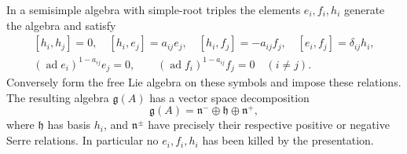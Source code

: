 \begin{proposition}
\label{res:F02}
In a semisimple algebra with simple-root triples the elements
\(e_i,f_i,h_i\) generate the algebra and satisfy
\[
\begin{gathered}
[h_i,h_j]=0,\quad [h_i,e_j]=a_{ij}e_j,\quad
[h_i,f_j]=-a_{ij}f_j,\quad [e_i,f_j]=\delta_{ij}h_i,\\
(\operatorname{ad}e_i)^{1-a_{ij}}e_j=0,\qquad
(\operatorname{ad}f_i)^{1-a_{ij}}f_j=0\quad(i\ne j).
\end{gathered}\tag{6.1}\label{eq:serre-relations}
\]
Conversely form the free Lie algebra on these symbols and impose
these relations. The resulting algebra \(\mathfrak g(A)\)
has a vector space decomposition
\[
 \mathfrak g(A)=\mathfrak n^-\oplus\mathfrak h\oplus\mathfrak n^+,
\]
where \(\mathfrak h\) has basis \(h_i\), and
\(\mathfrak n^\pm\) have precisely their respective positive
or negative Serre relations. In particular no \(e_i,f_i,h_i\)
has been killed by the presentation.
\end{proposition}
